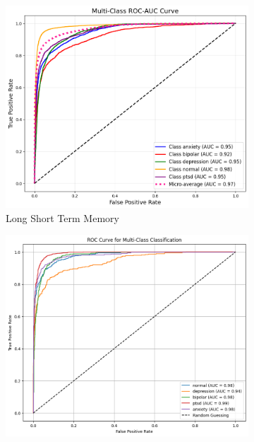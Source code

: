 \begin{figure}[H]
    \centering
    \begin{subfigure}[b]{0.49\textwidth}
        \centering
        \includegraphics[width=\textwidth]{Images/LSTM ROC.png}
        \caption*{Long Short Term Memory}
        \label{LSTMROC}  %
    \end{subfigure}
    \hfill
    \begin{subfigure}[b]{0.49\textwidth}
        \centering
        \includegraphics[width=\textwidth]{Images/T ROC.png}

\end{subfigure}
\end{figure}
